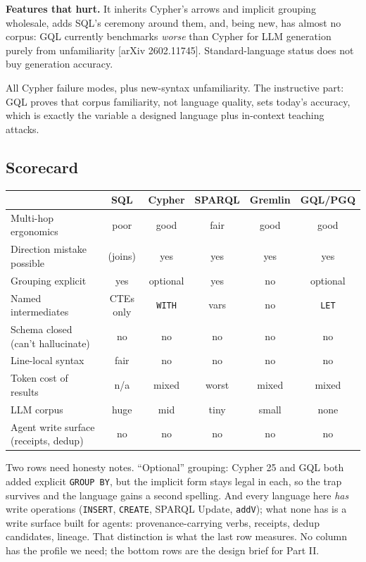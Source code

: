 \documentclass[11pt]{article}
\begin{document}
\textbf{Features that hurt.} It inherits Cypher's arrows and implicit grouping wholesale, adds SQL's ceremony around them, and, being new, has almost no corpus: GQL currently benchmarks \emph{worse} than Cypher for LLM generation purely from unfamiliarity [arXiv 2602.11745]. Standard-language status does not buy generation accuracy.

\begin{failbox}
All Cypher failure modes, plus new-syntax unfamiliarity. The instructive part: GQL proves that corpus familiarity, not language quality, sets today's accuracy, which is exactly the variable a designed language plus in-context teaching attacks.
\end{failbox}

\subsection{Scorecard}

\begin{center}
\small
\begin{tabular}{lccccc}
\toprule
 & SQL & Cypher & SPARQL & Gremlin & GQL/PGQ \\
\midrule
Multi-hop ergonomics        & poor & good & fair & good & good \\
Direction mistake possible  & (joins) & yes & yes & yes & yes \\
Grouping explicit           & yes & optional & yes & no & optional \\
Named intermediates         & CTEs only & \texttt{WITH} & vars & no & \texttt{LET} \\
Schema closed (can't hallucinate) & no & no & no & no & no \\
Line-local syntax           & fair & no & no & no & no \\
Token cost of results       & n/a & mixed & worst & mixed & mixed \\
LLM corpus                  & huge & mid & tiny & small & none \\
Agent write surface (receipts, dedup) & no & no & no & no & no \\
\bottomrule
\end{tabular}
\end{center}

Two rows need honesty notes. ``Optional'' grouping: Cypher 25 and GQL both added explicit \texttt{GROUP BY}, but the implicit form stays legal in each, so the trap survives and the language gains a second spelling. And every language here \emph{has} write operations (\texttt{INSERT}, \texttt{CREATE}, SPARQL Update, \texttt{addV}); what none has is a write surface built for agents: provenance-carrying verbs, receipts, dedup candidates, lineage. That distinction is what the last row measures. No column has the profile we need; the bottom rows are the design brief for Part II.
\end{document}
